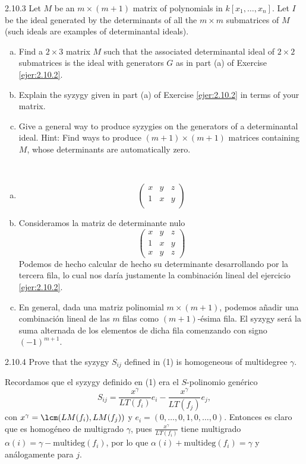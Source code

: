 \documentclass[twoside]{article}
\begin{document}
\begin{ejercicio}{2.10.3}
Let $M$ be an $m × (m + 1)$ matrix of polynomials in $k[x_1, \dots , x_n]$. Let $I$ be the ideal generated
by the determinants of all the $m × m$ submatrices of $M$ (such ideals are examples
of determinantal ideals).
\begin{enumerate}[a.]
\item Find a $2×3$ matrix $M$ such that the associated determinantal ideal of $2×2$ submatrices
is the ideal with generators $G$ as in part (a) of Exercise \ref{ejer:2.10.2}.
\item Explain the syzygy given in part (a) of Exercise \ref{ejer:2.10.2} in terms of your matrix.
\item Give a general way to produce syzygies on the generators of a determinantal ideal.
Hint: Find ways to produce $(m + 1) × (m + 1)$ matrices containing $M$, whose determinants
are automatically zero.
\end{enumerate}
\end{ejercicio}
\begin{solucion}\
\begin{enumerate}[a.]
\item 
\[
\begin{pmatrix}
 x& y & z\\
 1& x & y \\
\end{pmatrix}
\]

\item Consideramos la matriz de determinante nulo
\[
\begin{pmatrix}
 x& y & z\\
 1& x & y \\
 x &y & z
\end{pmatrix}
\]
Podemos de hecho calcular de hecho su determinante desarrollando por la tercera fila, lo cual nos daría justamente la combinación lineal del ejercicio \ref{ejer:2.10.2}.

\item En general, dada una matriz polinomial $m\times (m+1)$, podemos añadir una combinación lineal de las $m$ filas como $(m+1)$-ésima fila. El syzygy será la suma alternada de los elementos de dicha fila comenzando con signo $(-1)^{m+1}$.
\end{enumerate}
\end{solucion}

\newpage

\begin{ejercicio}{2.10.4}
Prove that the syzygy $S_{ij}$ defined in (1) is homogeneous of multidegree $γ$.
\end{ejercicio}
\begin{solucion}
Recordamos que el syzygy definido en (1) era el $S$-polinomio genérico
\[
S_{ij}=\frac{x^\gamma}{LT(f_i)}e_i-\frac{x^\gamma}{LT(f_j)}e_j,
\]
con $x^\gamma=\lcm(LM(f_i),LM(f_j))$ y $e_i=(0,\dots,0,1,0,\dots, 0)$. Entonces es claro que es homogéneo de multigrado $\gamma$, pues $\frac{x^\gamma}{LT(f_i)}$ tiene multigrado $\alpha(i)=\gamma-\mathrm{multideg}(f_i)$, por lo que $\alpha(i)+\mathrm{multideg}(f_i)=\gamma$ y análogamente para $j$.
\end{solucion}
\newpage
\end{document}
